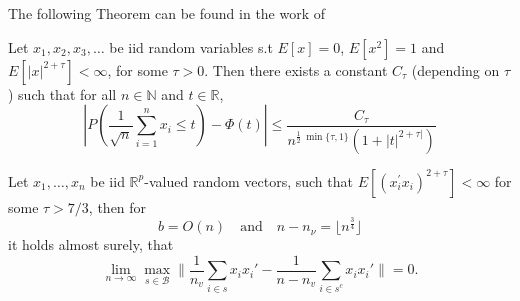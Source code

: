 \documentclass[Research_Module_ES.tex]{subfiles}
\begin{document}
The following Theorem can be found in the work of \cite{michel1976nonuniform}
\begin{thm}\label{Michel76Thm3}
Let $x_1,x_2,x_3,\ldots$ be iid random variables s.t $E[x]=0$, $E[x^2]=1$ and $E[|x|^{2+\tau}]<\infty$, for some $\tau>0$. Then there exists a constant $C_\tau$ (depending on $\tau$) such that for all $n\in \mathbb{N}$ and $t\in\mathbb{R}$,
\[
	\left| P\left( \frac{1}{\sqrt{n}}\sum_{i=1}^{n}x_i\leq t \right) -\Phi(t) \right| \leq \frac{C_\tau}{n^{\frac{1}{2}~ \min\{\tau,1\}} (1+|t|^{2+\tau|}) }
\] 

\end{thm}	
	
\begin{claim}
Let $x_1,\ldots,x_n$ be iid $\mathbb{R}^p$-valued random vectors, such that $E[(x^\prime_i x_i)^{2+\tau}]<\infty$ for some $\tau>7/3$, then for 
\[
	b=O(n)\quad\textrm{and}\quad n-n_\nu=\lfloor n^{\frac{3}{4}}\rfloor
\]
it holds almost surely, that
\[
\lim_{n\to\infty} \max_{s\in \mathcal{B}}\biggl\lVert \frac{1}{n_v}\sum_{i\in s}x_ix_i' - \frac{1}{n-n_v}\sum_{i\in s^c}x_ix_i'\biggr\rVert =0. \label{gram_matrix_condition_BICV}
\]
\end{claim}
\end{document}
